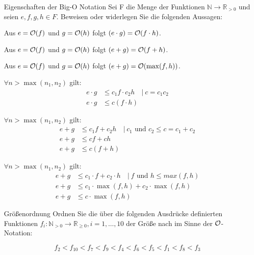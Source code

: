 \documentclass{article}
\begin{document}
\begin{eexercises}{Eigenschaften der Big-O Notation}{
    Sei F die Menge der Funktionen $\mathbb{N} \rightarrow \mathbb{R}_{>0}$ und seien $e, f, g, h \in F$. Beweisen oder widerlegen Sie die folgenden Aussagen:
  }
  \item Aus $e = \mathcal{O}(f)$ und $g = \mathcal{O}(h)$ folgt $(e \cdot g) = \mathcal{O}(f \cdot h)$.
  \item Aus $e = \mathcal{O}(f)$ und $g = \mathcal{O}(h)$ folgt $(e + g) = \mathcal{O}(f + h)$.
  \item Aus $e = \mathcal{O}(f)$ und $g = \mathcal{O}(h)$ folgt $(e + g) = \mathcal{O}(\max(f,h))$.
\end{eexercises}

\begin{solutions}
  \item $\forall n>\max(n_1,n_2)$ gilt:
  \begin{align*}
    e \cdot g & \leq c_1 f \cdot c_2 h \quad|\ c=c_1c_2 \\
    e \cdot g & \leq c (f \cdot h)
  \end{align*}
  \item $\forall n>\max(n_1,n_2)$ gilt:
  \begin{align*}
    e + g & \leq c_1 f + c_2 h \quad|\ c_1 \text{ und } c_2 \leq c=c_1+c_2 \\
    e + g & \leq cf + ch                                                   \\
    e + g & \leq c(f + h)
  \end{align*}
  \item $\forall n>\max(n_1,n_2)$ gilt:
  \begin{align*}
    e + g & \leq c_1 \cdot f + c_2 \cdot h \quad|\ f\text{ und } h \leq max(f,h) \\
    e + g & \leq c_1 \cdot \max(f,h) + c_2 \cdot \max(f,h)                       \\
    e + g & \leq c \cdot \max(f,h)
  \end{align*}
\end{solutions}

\begin{exercise}{Größenordnung}
  Ordnen Sie die über die folgenden Ausdrücke definierten Funktionen $f_i : \mathbb{N}_{>0} \rightarrow \mathbb{R}_{\geq 0}, i = 1, \ldots, 10$ der Größe nach im Sinne der $\mathcal{O}$-Notation:
  

  \begin{solution}
    \begin{equation*}
      f_2 < f_{10} < f_7 < f_9 < f_4 < f_6 < f_5 < f_1 < f_8 < f_3
    \end{equation*}
  \end{solution}
\end{exercise}
\end{document}
